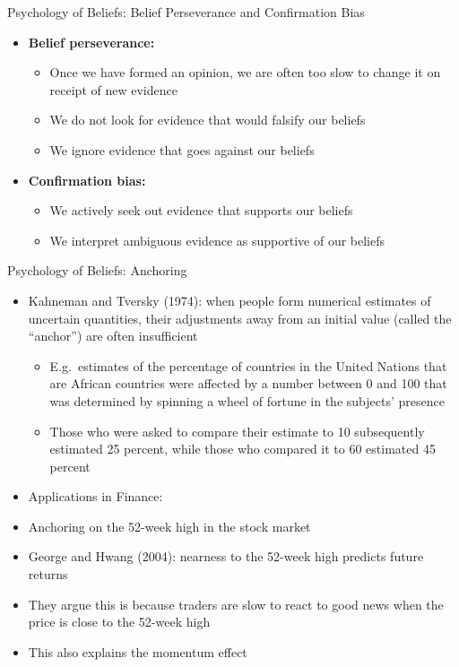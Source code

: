 \documentclass[aspectratio=169, 11pt]{beamer}
\begin{document}
\begin{frame}{Psychology of Beliefs: Belief Perseverance and Confirmation Bias}
\begin{itemize}
\item \textbf{Belief perseverance:}
  \begin{itemize}
  \item Once we have formed an opinion, we are often too slow to change it on receipt of new evidence
  \item We do not look for evidence that would falsify our beliefs
  \item We ignore evidence that goes against our beliefs
  \end{itemize}
\item \textbf{Confirmation bias:}
  \begin{itemize}
  \item We actively seek out evidence that supports our beliefs
  \item We interpret ambiguous evidence as supportive of our beliefs
  \end{itemize}
\end{itemize}
\end{frame}

\begin{frame}{Psychology of Beliefs: Anchoring}
\begin{itemize}
\item Kahneman and Tversky (1974): when people form numerical estimates of uncertain quantities, their adjustments away from an initial value (called the ``anchor'') are often insufficient
\begin{itemize}
\item E.g.\ estimates of the percentage of countries in the United Nations that are African countries were affected by a number between 0 and 100 that was determined by spinning a wheel of fortune in the subjects' presence
\item Those who were asked to compare their estimate to 10 subsequently estimated 25 percent, while those who compared it to 60 estimated 45 percent
\end{itemize} 
\item Applications in Finance:
\end{itemize}
\begin{itemize}
\item Anchoring on the 52-week high in the stock market
\item George and Hwang (2004): nearness to the 52-week high predicts future returns
\item They argue this is because traders are slow to react to good news when the price is close to the 52-week high
\item This also explains the momentum effect
\end{itemize} 
\end{frame}
\end{document}
